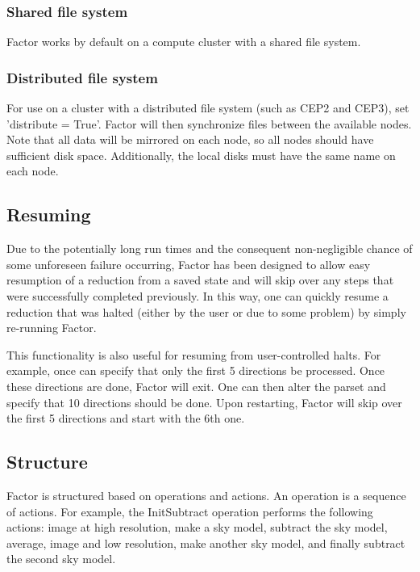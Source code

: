 \documentclass[structabstract]{article}
\begin{document}
{\subsubsection{Shared file system}
Factor works by default on a compute cluster with a shared file system.

\subsubsection{Distributed file system}
For use on a cluster with a distributed file system (such as CEP2 and CEP3), set
'distribute = True'. Factor will then synchronize files between the available
nodes. Note that all data will be mirrored on each node, so all nodes should
have sufficient disk space. Additionally, the local disks must have the same
name on each node.


\subsection{Resuming}
\label{factor:resuming}

Due to the potentially long run times and the consequent non-negligible chance
of some unforeseen failure occurring, Factor has been designed to allow easy
resumption of a reduction from a saved state and will skip over any steps that
were successfully completed previously. In this way, one can quickly resume a
reduction that was halted (either by the user or due to some problem) by simply
re-running Factor.

This functionality is also useful for resuming from user-controlled halts. For
example, once can specify that only the first 5 directions be processed. Once
these directions are done, Factor will exit. One can then alter the parset and
specify that 10 directions should be done. Upon restarting, Factor will skip
over the first 5 directions and start with the 6th one.


\subsection{Structure}
\label{factor:structure}

Factor is structured based on operations and actions. An operation is a sequence of actions. For example, the InitSubtract operation performs the following actions: image at high resolution, make a sky model, subtract the sky model, average, image and low resolution, make another sky model, and finally subtract the second sky model.

}
\end{document}
